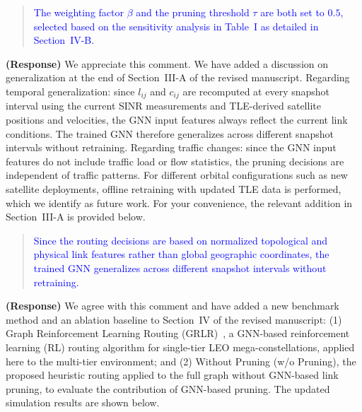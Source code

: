 \documentclass[letter]{article}
\begin{document}
\begin{quote}
\textcolor{blue}{The weighting factor $\beta$ and the pruning threshold $\tau$ are both set to $0.5$, selected based on the sensitivity analysis in Table~I as detailed in Section~IV-B.}
\end{quote}

\vspace{10mm}
\noindent {}

\vspace{5mm}
{\bf (Response)}
We appreciate this comment. We have added a discussion on generalization at the end of Section~III-A of the revised manuscript. Regarding temporal generalization: since $l_{ij}$ and $c_{ij}$ are recomputed at every snapshot interval using the current SINR measurements and TLE-derived satellite positions and velocities, the GNN input features always reflect the current link conditions. The trained GNN therefore generalizes across different snapshot intervals without retraining. Regarding traffic changes: since the GNN input features do not include traffic load or flow statistics, the pruning decisions are independent of traffic patterns. For different orbital configurations such as new satellite deployments, offline retraining with updated TLE data is performed, which we identify as future work. For your convenience, the relevant addition in Section~III-A is provided below.

\begin{quote}
\textcolor{blue}{Since the routing decisions are based on normalized topological and physical link features rather than global geographic coordinates, the trained GNN generalizes across different snapshot intervals without retraining.}
\end{quote}

\vspace{10mm}
\noindent {}

\vspace{5mm}
{\bf (Response)}
We agree with this comment and have added a new benchmark method and an ablation baseline to Section~IV of the revised manuscript: (1) Graph Reinforcement Learning Routing (GRLR)~\cite{zhang2025grlr}, a GNN-based reinforcement learning (RL) routing algorithm for single-tier LEO mega-constellations, applied here to the multi-tier environment; and (2) Without Pruning (w/o Pruning), the proposed heuristic routing applied to the full graph without GNN-based link pruning, to evaluate the contribution of GNN-based pruning. The updated simulation results are shown below.
\end{document}
